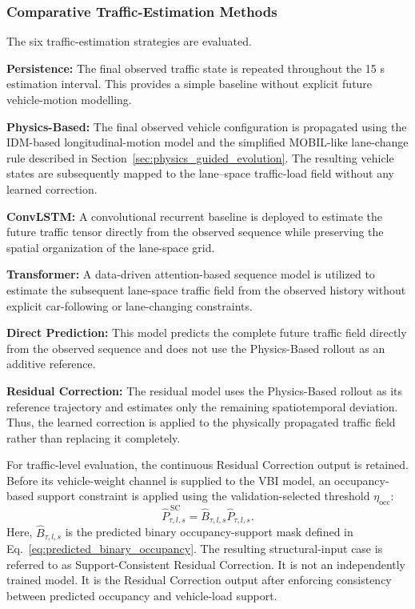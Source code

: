 \documentclass[journal]{IEEEtran}
\begin{document}
\subsubsection{Comparative Traffic-Estimation Methods}

The six traffic-estimation strategies are evaluated.

\textbf{Persistence:}
The final observed traffic state is repeated throughout the 15 s estimation interval. This provides a simple baseline without explicit future vehicle-motion modelling.

\textbf{Physics-Based:}
The final observed vehicle configuration is propagated using the IDM-based longitudinal-motion model and the simplified MOBIL-like lane-change rule described in Section~\ref{sec:physics_guided_evolution}. The resulting vehicle states are subsequently mapped to the lane--space traffic-load field without any learned correction.

\textbf{ConvLSTM:}
A convolutional recurrent baseline is deployed to estimate the future traffic tensor directly from the observed sequence while preserving the spatial organization of the lane-space grid.

\textbf{Transformer:}
A data-driven attention-based sequence model is utilized to estimate the subsequent lane-space traffic field from the observed history without explicit car-following or lane-changing constraints.

\textbf{Direct Prediction:}
This model predicts the complete future traffic field directly from the observed sequence and does not use the Physics-Based rollout as an additive reference.

\textbf{Residual Correction:}
The residual model uses the Physics-Based rollout as its reference trajectory and estimates only the remaining spatiotemporal deviation. Thus, the learned correction is applied to the physically propagated traffic field rather than replacing it completely.

For traffic-level evaluation, the continuous Residual Correction output is retained. Before its vehicle-weight channel is supplied to the VBI model, an occupancy-based support constraint is applied using the validation-selected threshold $\eta_{\mathrm{occ}}$:
\begin{equation}
\widehat{P}^{\,\mathrm{SC}}_{\tau,l,s}=\widehat{B}_{\tau,l,s}\widehat{P}_{\tau,l,s}.
\label{eq:support_consistent_load}
\end{equation}
Here, $\widehat{B}_{\tau,l,s}$ is the predicted binary occupancy-support mask defined in Eq.~\eqref{eq:predicted_binary_occupancy}.
The resulting structural-input case is referred to as Support-Consistent Residual Correction. It is not an independently trained model. It is the Residual Correction output after enforcing consistency between predicted occupancy and vehicle-load support.
\end{document}
